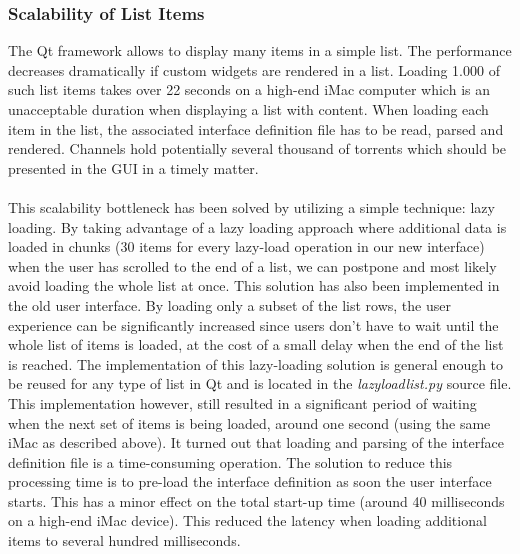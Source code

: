 \subsubsection{\textbf{Scalability of List Items}}
The Qt framework allows to display many items in a simple list. The performance decreases dramatically if custom widgets are rendered in a list. Loading 1.000 of such list items takes over 22 seconds on a high-end iMac computer which is an unacceptable duration when displaying a list with content. When loading each item in the list, the associated interface definition file has to be read, parsed and rendered. Channels hold potentially several thousand of torrents which should be presented in the GUI in a timely matter.\\\\
This scalability bottleneck has been solved by utilizing a simple technique: lazy loading. By taking advantage of a lazy loading approach where additional data is loaded in chunks (30 items for every lazy-load operation in our new interface) when the user has scrolled to the end of a list, we can postpone and most likely avoid loading the whole list at once. This solution has also been implemented in the old user interface. By loading only a subset of the list rows, the user experience can be significantly increased since users don't have to wait until the whole list of items is loaded, at the cost of a small delay when the end of the list is reached. The implementation of this lazy-loading solution is general enough to be reused for any type of list in Qt and is located in the \emph{lazyloadlist.py} source file. This implementation however, still resulted in a significant period of waiting when the next set of items is being loaded, around one second (using the same iMac as described above). It turned out that loading and parsing of the interface definition file is a time-consuming operation. The solution to reduce this processing time is to pre-load the interface definition as soon the user interface starts. This has a minor effect on the total start-up time (around 40 milliseconds on a high-end iMac device). This reduced the latency when loading additional items to several hundred milliseconds.

